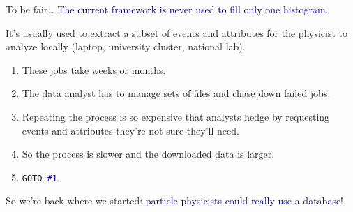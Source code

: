 \documentclass[aspectratio=169]{beamer}
\begin{document}
\begin{frame}{To be fair\ldots}
\vspace{0.5 cm}
\large \textcolor{darkblue}{The current framework is never used to fill only one histogram.}

\vspace{0.5 cm}
It's usually used to extract a subset of events and attributes for the physicist to analyze locally (laptop, university cluster, national lab).

\vspace{0.25 cm}
\begin{enumerate}
\item<2-> These jobs take weeks or months.
\item<3-> The data analyst has to manage sets of files and chase down failed jobs.
\item<4-> Repeating the process is so expensive that analysts hedge by requesting events and attributes they're not sure they'll need.
\item<5-> So the process is slower and the downloaded data is larger.
\item<6-> {\tt\normalsize GOTO \textcolor{darkblue}{\#1}}.
\end{enumerate}
\end{frame}

\begin{frame}{}
\vspace{0.75 cm}
\begin{center}
\begin{minipage}{0.83\linewidth}
\begin{center}
\Large So we're back where we started: \textcolor{darkblue}{particle physicists could really use a database!}

\vspace{0.5 cm}

\vspace{0.5 cm}
\end{center}
\end{minipage}
\end{center}
\end{frame}

\begin{frame}{}


\end{frame}
\end{document}
